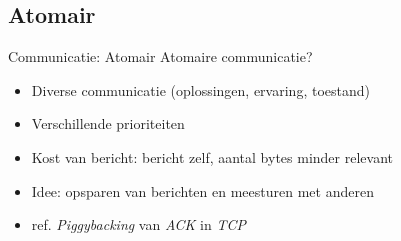 \documentclass[handout]{beamer}
\begin{document}
\subsection{Atomair}
\begin{frame}{Communicatie: Atomair}
Atomaire communicatie?
\begin{itemize}[<+->]
 \item Diverse communicatie (oplossingen, ervaring, toestand)
 \item Verschillende prioriteiten
 \item Kost van bericht: bericht zelf, aantal bytes minder relevant
 \item Idee: opsparen van berichten en meesturen met anderen
 \item ref. \emph{Piggybacking} van \emph{ACK} in \emph{TCP}
\end{itemize}
\end{frame}
\end{document}
